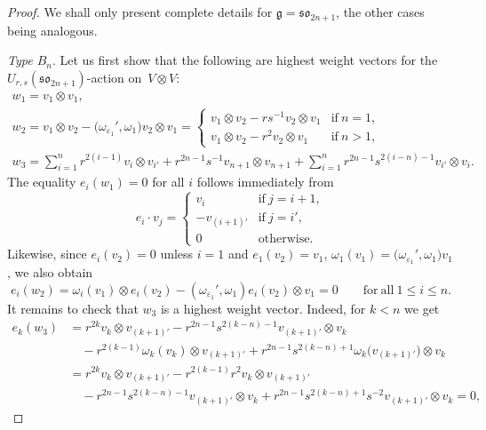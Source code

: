 \documentclass[pdftex]{sigma}
\numberwithin{equation}{section}
\newcommand{\sso}{\mathfrak{so}}
\begin{document}
\begin{proof}
We shall only present complete details for $\mathfrak{g} = \mathfrak{so}_{2n + 1}$, the other cases being analogous.

\textit{Type $B_n$}.
Let us first show that the following are highest weight vectors for the $U_{r,s}(\sso_{2n+1})$-action on~${V \otimes V}$:
\begin{gather}
 w_{1} = v_{1} \otimes v_{1}, \nonumber\\
 w_{2} = v_{1} \otimes v_{2} - \bigl(\omega_{\varepsilon_{1}}',\omega_{1}\bigr)v_{2} \otimes v_{1} =
 \begin{cases}
 v_{1} \otimes v_{2} - rs^{-1}v_{2} \otimes v_{1} & \text{if}\ n = 1, \\
 v_{1} \otimes v_{2} - r^2 v_{2} \otimes v_{1} & \text{if}\ n > 1 ,
 \end{cases} \nonumber\\
 w_{3} = \sum_{i=1}^{n} r^{2(i - 1)}v_{i} \otimes v_{i'} + r^{2n - 1}s^{-1}v_{n + 1}\otimes v_{n+1} +
 \sum_{i = 1}^{n}r^{2n - 1}s^{2(i - n) - 1}v_{i'} \otimes v_{i}.\label{eq:B_hwv}
\end{gather}
The equality $e_{i}(w_{1})=0$ for all $i$ follows immediately from
\[
 e_{i}\cdot v_{j} =
 \begin{cases}
 v_{i} & \text{if}\ j = i + 1 ,\\
 -v_{(i + 1)'} & \text{if}\ j = i', \\
 0 & \text{otherwise}.
 \end{cases}
\]
Likewise, since $e_{i}(v_{2})=0$ unless $i=1$ and $e_1(v_2)=v_1$, $\omega_1(v_1)=\bigl(\omega_{\varepsilon_{1}}',\omega_{1}\bigr)v_1$, we also obtain
\[
 e_{i}(w_{2}) =
 \omega_{i}(v_{1}) \otimes e_{i}(v_{2}) - (\omega_{\varepsilon_{1}}',\omega_{1}) e_{i}(v_{2}) \otimes v_{1} = 0
 \qquad \mathrm{for\ all} \ 1\leq i\leq n.
\]
It remains to check that $w_3$ is a highest weight vector. Indeed, for $k<n$ we get
\begin{align*}
 e_{k}(w_{3})&{}=
 r^{2k}v_{k}\otimes v_{(k+1)'} - r^{2n-1}s^{2(k-n)-1} v_{(k+1)'}\otimes v_{k}
 \\
 &\quad{}- r^{2(k-1)} \omega_k(v_{k})\otimes v_{(k+1)'} + r^{2n-1}s^{2(k-n)+1} \omega_k\bigl(v_{(k + 1)'}\bigr) \otimes v_{k} \\
 &{}= r^{2k}v_{k} \otimes v_{(k + 1)'} - r^{2(k - 1)}r^{2}v_{k} \otimes v_{(k + 1)'} \\
 &\quad{}-
 r^{2n - 1}s^{2(k - n)-1}v_{(k + 1)'} \otimes v_{k} + r^{2n - 1}s^{2(k - n) + 1}s^{-2}v_{(k + 1)'} \otimes v_{k} = 0,
\end{align*}

\end{proof}
\end{document}
